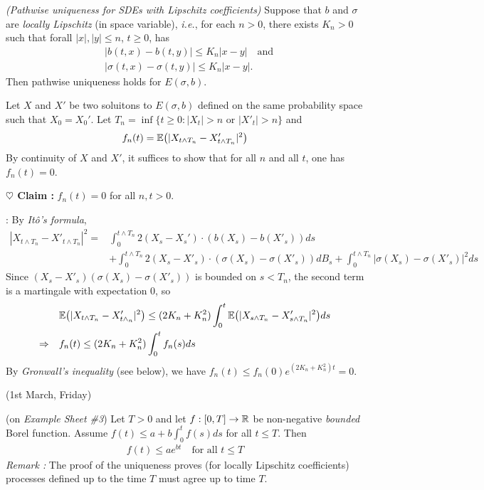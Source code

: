 \documentclass[12pt,a4paper]{article}
\newenvironment{proof}
{\begin{changemargin}{0.5cm}{0.5cm} 
	}%
	{\end{changemargin}
}
\newenvironment{subproof}
{\begin{changemargin}{0.5cm}{0.5cm} 
	}%
	{\end{changemargin}
}
\newenvironment{p}
{\begin{proof} 
	}%
	{\end{proof}
}
\begin{document}
\thm \emph{(Pathwise uniqueness for SDEs with Lipschitz coefficients)} Suppose that $b$ and $\sigma$ are \emph{locally Lipschitz} (in space variable), \textit{i.e.}, for each $n >0$, there exists $K_n >0$ such that forall $|x|, |y| \leq n$, $t\geq 0$, has 
\begin{align*}
&|b(t,x) - b(t, y)| \leq K_n |x-y| \quad \text{and} \\
&|\sigma(t,x) - \sigma(t,y)| \leq K_n |x-y|.
\end{align*}
Then pathwise uniqueness holds for $E(\sigma,b)$.
\begin{p}
\pf Let $X$ and $X'$ be two soluitons to $E(\sigma, b)$ defined on the same probability space such that $X_0 = X_0'$. Let $T_n = \inf \{t\geq 0: |X_t| >n \text{ or }|X'_t| >n \}$ and
\begin{align*}
f_n(t) = \mathbb{E} \big( |X_{t\wedge T_n} - X'_{t\wedge T_n}|^2 \big)
\end{align*}
By continuity of $X$ and $X'$, it suffices to show that for all $n$ and all $t$, one has $f_n(t) =0$. 

\textbf{$\heartsuit$ Claim :} $f_n(t) = 0$ for all $n, t>0$.
\begin{subproof}
: By \emph{It\^o's formula},
\begin{align*}
|X_{t\wedge T_n} - X'_{t\wedge T_n}|^2 = & \int_0^{t\wedge T_n } 2(X_s - X_s') \cdot (b(X_s)- b(X'_s)) ds \\
& + \int_0^{t\wedge T_n} 2(X_s - X'_s) \cdot (\sigma(X_s) - \sigma(X'_s)) dB_s + \int_0^{t\wedge T_n} |\sigma(X_s) - \sigma(X'_s)|^2 ds
\end{align*}
Since $(X_s - X'_s)(\sigma(X_s)- \sigma(X'_s))$ is bounded on $s< T_n$, the second term is a martingale with expectation 0, so
\begin{align*}
& \mathbb{E} \big( |X_{t\wedge T_n} - X'_{t\wedge_n}|^2 \big) \leq  (2K_n + K_n^2) \int_0^{t} \mathbb{E}\big( |X_{s\wedge T_n} - X'_{s\wedge T_n}|^2 \big) ds \\
\Rightarrow \quad &f_n(t) \leq (2K_n + K_n^2) \int_0^{t} f_n(s) ds
\end{align*}
By \emph{Gronwall's inequality} (see below), we have $f_n(t) \leq  f_n(0) e^{(2K_n + K_n^2)t} =0$.
\end{subproof} 
\eop
\end{p}
\s

\newday

(1st March, Friday)
\s

 (on \emph{Example Sheet \#3}) Let $T>0$ and let $f:[0, T] \rightarrow \mathbb{R}$ be non-negative \emph{bounded} Borel function. Assume $f(t) \leq a + b \int_0^t f(s) ds$ for all $t\leq T$. Then
\begin{align*}
f(t) \leq ae^{bt} \quad \text{for all } t\leq T
\end{align*}
\emph{Remark :} The proof of the uniqueness proves (for locally Lipschitz coefficients) processes defined up to the time $T$ must agree up to time $T$.
\end{document}

